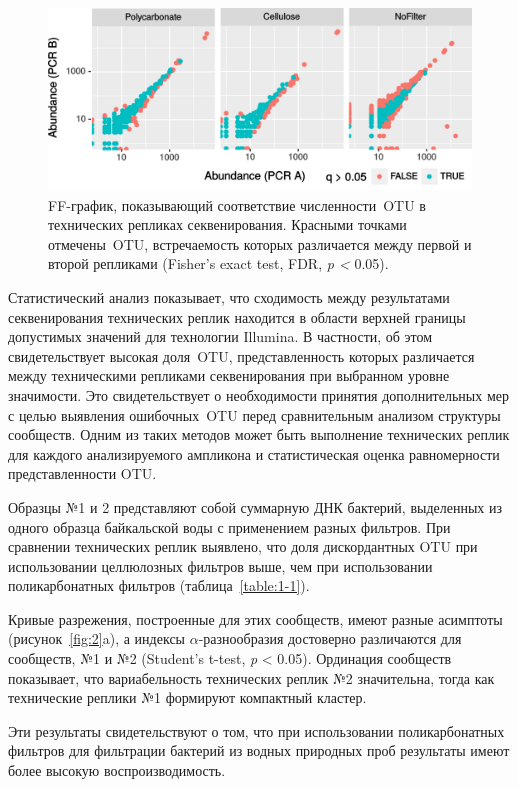 \documentclass[a4paper,12pt,openany,final]{extreport}
\newcommand*{\hl}[1]{%
\tikz[baseline]\node[rectangle, fill=yellow, rounded corners, inner sep=0.3mm,anchor=base]{#1};%
}
\def\oldcaption{} \let\oldcaption=\caption
\def\caption{\stepcounter{captionsnum}\oldcaption}
\providecommand\hl[1]{}
\renewcommand\hl[1]{#1}
\begin{document}
\begin{figure}[b!]\centering
\includegraphics[width=0.9\linewidth]{media/image5.png}

\caption{FF-график, показывающий соответствие численности~OTU в технических репликах секвенирования. Красными точками отмечены~OTU, встречаемость которых различается между первой и второй репликами (Fisher's exact test, FDR, \emph{p \textless{}} 0.05).}\label{fig:1-1}
\end{figure}

Статистический анализ показывает, что сходимость между результатами секвенирования технических реплик находится в области верхней границы допустимых значений для технологии Illumina. В частности, об этом свидетельствует высокая доля~OTU, представленность которых различается между техническими репликами секвенирования при выбранном уровне значимости. Это свидетельствует о необходимости принятия дополнительных мер с целью выявления ошибочных~OTU перед сравнительным анализом структуры сообществ. Одним из таких методов может быть выполнение технических реплик для каждого анализируемого ампликона и статистическая оценка равномерности представленности OTU.

Образцы №1 и 2 представляют собой суммарную ДНК бактерий, выделенных из одного образца байкальской воды с применением разных фильтров. При сравнении технических реплик выявлено, что доля дискордантных OTU при использовании целлюлозных фильтров выше, чем при использовании поликарбонатных фильтров (таблица~\ref{table:1-1}).


Кривые разрежения, построенные для этих сообществ, имеют разные асимптоты (рисунок~\ref{fig:2}a), а индексы \(\alpha\)-разнообразия достоверно различаются для сообществ, №1 и №2 (Student's t-test, \emph{p} \textless{} 0.05).  Ординация сообществ показывает, что вариабельность технических реплик №2 значительна, тогда как технические реплики №1 формируют компактный кластер.

Эти \hl{результаты} свидетельствуют о том, что при использовании поликарбонатных фильтров для фильтрации бактерий из водных природных проб \hl{результаты} имеют более высокую воспроизводимость.
\end{document}
